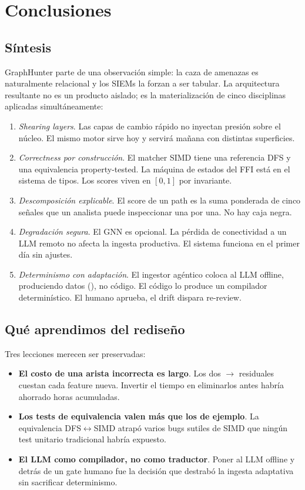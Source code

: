 \chapter{Conclusiones}
\label{sec:paper-conc}

\section{Síntesis}

GraphHunter parte de una observación simple: la caza de amenazas
es naturalmente relacional y los SIEMs la forzan a ser
tabular. La arquitectura resultante no es un producto aislado;
es la materialización de cinco disciplinas aplicadas
simultáneamente:

\begin{enumerate}
    \item \emph{Shearing layers}. Las capas de cambio rápido no
    inyectan presión sobre el núcleo. El mismo motor sirve
    hoy y servirá mañana con distintas superficies.
    \item \emph{Correctness por construcción}. El matcher SIMD tiene
    una referencia DFS y una equivalencia property-tested. La
    máquina de estados del FFI está en el sistema de tipos. Los
    scores viven en $[0,1]$ por invariante.
    \item \emph{Descomposición explicable}. El score de un path es
    la suma ponderada de cinco señales que un analista puede
    inspeccionar una por una. No hay caja negra.
    \item \emph{Degradación segura}. El GNN es opcional. La
    pérdida de conectividad a un LLM remoto no afecta la
    ingesta productiva. El sistema funciona en el primer
    día sin ajustes.
    \item \emph{Determinismo con adaptación}. El ingestor agéntico
    coloca al LLM offline, produciendo datos
    (), no código. El código lo produce un
    compilador determinístico. El humano aprueba, el drift
    dispara re-review.
\end{enumerate}

\section{Qué aprendimos del rediseño}

Tres lecciones merecen ser preservadas:

\begin{itemize}
    \item \textbf{El costo de una arista incorrecta es largo}. Los
    dos $\to$ residuales cuestan cada
    feature nueva. Invertir el tiempo en eliminarlos antes habría
    ahorrado horas acumuladas.
    \item \textbf{Los tests de equivalencia valen más que los de
    ejemplo}. La equivalencia DFS$\leftrightarrow$SIMD atrapó
    varios bugs sutiles de SIMD que ningún test unitario
    tradicional habría expuesto.
    \item \textbf{El LLM como compilador, no como traductor}. Poner
    al LLM offline y detrás de un gate humano fue la decisión que
    destrabó la ingesta adaptativa sin sacrificar determinismo.
\end{itemize}

